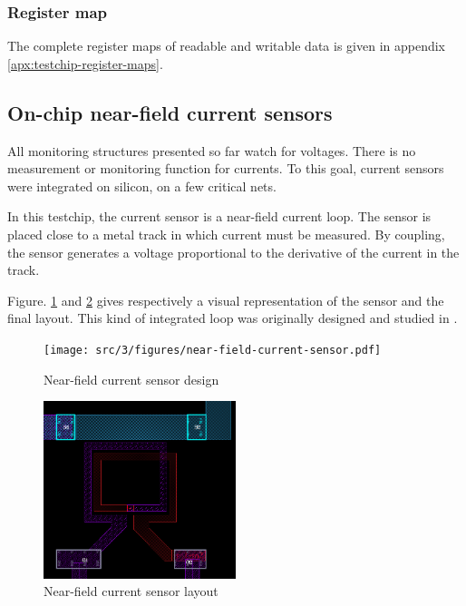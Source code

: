 \subsubsection{Register map}

The complete register maps of readable and writable data is given in appendix \ref{apx:testchip-register-maps}.

\subsection{On-chip near-field current sensors}

All monitoring structures presented so far watch for voltages.
There is no measurement or monitoring function for currents.
To this goal, current sensors were integrated on silicon, on a few critical nets.

In this testchip, the current sensor is a near-field current loop.
The sensor is placed close to a metal track in which current must be measured.
By coupling, the sensor generates a voltage proportional to the derivative of the current in the track.

Figure. \ref{fig:near-field-current-sensor} and \ref{fig:near-field-current-sensor-layout} gives respectively a visual representation of the sensor and the final layout.
This kind of integrated loop was originally designed and studied in \cite{AlainSallesInductors}.

\begin{figure}[!htbp]
  \centering
  \texttt{[image: src/3/figures/near-field-current-sensor.pdf]}
  \caption{Near-field current sensor design}
  \label{fig:near-field-current-sensor}
\end{figure}

\begin{figure}[!htbp]
  \centering
  \includegraphics[width=0.5\textwidth]{src/3/figures/sensor_layout.png}
  \caption{Near-field current sensor layout}
  \label{fig:near-field-current-sensor-layout}
\end{figure}


